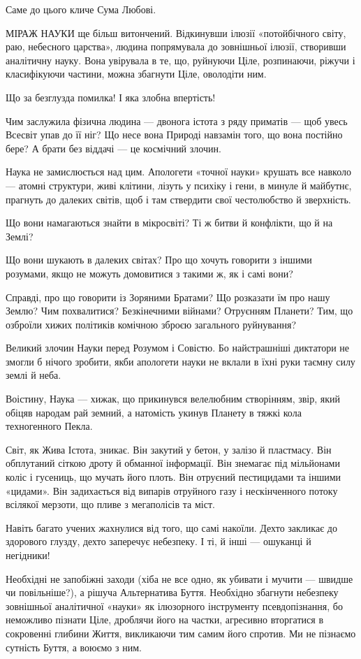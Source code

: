 Саме до цього кличе Сума Любові.

МІРАЖ НАУКИ ще більш витончений. Відкинувши ілюзії «потойбічного світу, раю,
небесного царства», людина попрямувала до зовнішньої ілюзії, створивши
аналітичну науку. Вона увірувала в те, що, руйнуючи Ціле, розпинаючи, ріжучи і
класифікуючи частини, можна збагнути Ціле, оволодіти ним.


Що за безглузда помилка! І яка злобна впертість!

Чим заслужила фізична людина — двонога істота з ряду приматів — щоб увесь
Всесвіт упав до її ніг? Що несе вона Природі навзамін того, що вона постійно
бере? А брати без віддачі — це космічний злочин.

Наука не замислюється над цим. Апологети «точної науки» крушать все навколо —
атомні структури, живі клітини, лізуть у психіку і гени, в минуле й майбутнє,
прагнуть до далеких світів, щоб і там ствердити свої честолюбство й зверхність.

Що вони намагаються знайти в мікросвіті? Ті ж битви й конфлікти, що й на Землі?

Що вони шукають в далеких світах? Про що хочуть говорити з іншими розумами,
якщо не можуть домовитися з такими ж, як і самі вони?

Справді, про що говорити із Зоряними Братами? Що розказати їм про нашу Землю?
Чим похвалитися? Безкінечними війнами? Отруєнням Планети? Тим, що озброїли
хижих політиків комічною зброєю загального руйнування?

Великий злочин Науки перед Розумом і Совістю. Бо найстрашніші диктатори не
змогли б нічого зробити, якби апологети науки не вклали в їхні руки таємну силу
землі й неба.

Воістину, Наука — хижак, що прикинувся велелюбним створінням, звір, який обіцяв
народам рай земний, а натомість укинув Планету в тяжкі кола техногенного Пекла.

Світ, як Жива Істота, зникає. Він закутий у бетон, у залізо й пластмасу. Він
обплутаний сіткою дроту й обманної інформації. Він знемагає під мільйонами
коліс і гусениць, що мучать його плоть. Він отруєний пестицидами та іншими
«цидами». Він задихається від випарів отруйного газу і нескінченного потоку
всілякої мерзоти, що пливе з мегаполісів та міст.

Навіть багато учених жахнулися від того, що самі накоїли. Дехто закликає до
здорового глузду, дехто заперечує небезпеку. І ті, й інші — ошуканці й
негідники!

Необхідні не запобіжні заходи (хіба не все одно, як убивати і мучити — швидше
чи повільніше?), а рішуча Альтернатива Буття. Необхідно збагнути небезпеку
зовнішньої аналітичної «науки» як ілюзорного інструменту псевдопізнання, бо
неможливо пізнати Ціле, дроблячи його на частки, агресивно вторгатися в
сокровенні глибини Життя, викликаючи тим самим його спротив. Ми не пізнаємо
сутність Буття, а воюємо з ним.

